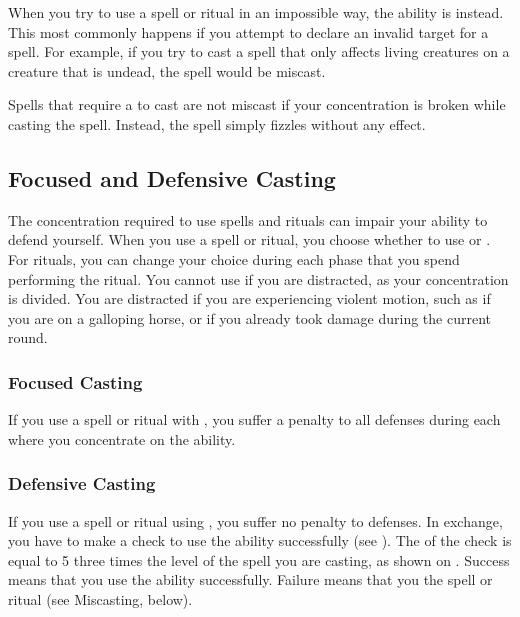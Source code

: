          When you try to use a spell or ritual in an impossible way, the ability is  instead.
        This most commonly happens if you attempt to declare an invalid target for a spell.
        For example, if you try to cast a spell that only affects living creatures on a creature that is undead, the spell would be miscast.

         Spells that require a  to cast are not miscast if your concentration is broken while casting the spell.
        Instead, the spell simply fizzles without any effect.

    \subsection{Focused and Defensive Casting}\label{Focused and Defensive Casting}
        The concentration required to use spells and rituals can impair your ability to defend yourself.
        When you use a spell or ritual, you choose whether to use  or .
        For rituals, you can change your choice during each phase that you spend performing the ritual.
        You cannot use  if you are distracted, as your concentration is divided.
        You are distracted if you are experiencing violent motion, such as if you are on a galloping horse, or if you already took damage during the current round.

        \subsubsection{Focused Casting}\label{Focused Casting}
            If you use a spell or ritual with , you suffer a  penalty to all defenses during each  where you concentrate on the ability.

        \subsubsection{Defensive Casting}\label{Defensive Casting}
            If you use a spell or ritual using , you suffer no penalty to defenses.
            In exchange, you have to make a  check to use the ability successfully (see ).
            The  of the check is equal to 5 \add three times the level of the spell you are casting, as shown on .
            Success means that you use the ability successfully.
            Failure means that you  the spell or ritual (see Miscasting, below).

